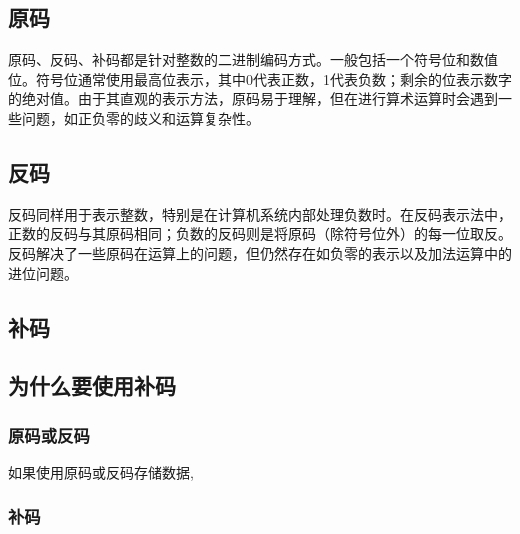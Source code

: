 \begin{issues}
\issueDraft
\end{issues}


\subsection{原码}

原码、反码、补码都是针对整数的二进制编码方式。一般包括一个符号位和数值位。符号位通常使用最高位表示，其中0代表正数，1代表负数；剩余的位表示数字的绝对值。由于其直观的表示方法，原码易于理解，但在进行算术运算时会遇到一些问题，如正负零的歧义和运算复杂性。

\subsection{反码}

反码同样用于表示整数，特别是在计算机系统内部处理负数时。在反码表示法中，正数的反码与其原码相同；负数的反码则是将原码（除符号位外）的每一位取反。反码解决了一些原码在运算上的问题，但仍然存在如负零的表示以及加法运算中的进位问题。

\subsection{补码}

\subsection{为什么要使用补码}

\subsubsection{原码或反码}

如果使用原码或反码存储数据,

\subsubsection{补码}


